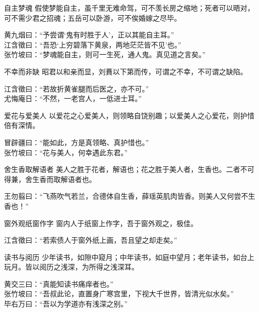 \begin{yulu}{自主梦魂}
假使梦能自主，虽千里无难命驾，可不羡长房之缩地；死者可以晤对，可不需少君之招魂；五岳可以卧游，可不俟婚嫁之尽毕。
\begin{comments}
黄九烟曰：“予尝谓‘鬼有时胜于人’，正以其能自主耳。” \\
江含徵曰：“吾恐‘上穷碧落下黄泉，两地茫茫皆不见’也。” \\
张竹坡曰：“梦魂能自主，则可一生死，通人鬼。真见道之言矣。”
\end{comments}
\end{yulu}

\begin{yulu}{不幸而非缺}
昭君以和亲而显，刘蕡以下第而传，可谓之不幸，不可谓之缺陷。
\begin{comments}
江含徵曰：“若故折黄雀腿而后医之，亦不可。” \\
尤悔庵日：“不然，一老宫人，一低进士耳。”
\end{comments}
\end{yulu}

\begin{yulu}{爱花与爱美人}
以爱花之心爱美人，则领略自饶别趣；以爱美人之心爱花，则护惜倍有深情。
\begin{comments}
冒辟疆曰：“能如此，方是真领略、真护惜也。” \\
张竹坡曰：“花与美人，何幸遇此东君。”
\end{comments}
\end{yulu}

\begin{yulu}{舍生香取解语者}
美人之胜于花者，解语也；花之胜于美人者，生香也。二者不可得兼，舍生香而取解语者也。
\begin{comments}
王勿翦曰：“飞燕吹气若兰，合德体自生香，薛瑶英肌肉皆香。则美人又何尝不生香也！”
\end{comments}
\end{yulu}

\begin{yulu}{窗外观纸窗作字}
窗内人于纸窗上作字，吾于窗外观之，极佳。
\begin{comments}
江含徵曰：“若索债人于窗外纸上画，吾且望之却走矣。”
\end{comments}
\end{yulu}

\begin{yulu}{读书与阅历}
少年读书，如隙中窥月；中年读书，如庭中望月；老年读书，如台上玩月。皆以阅历之浅深，为所得之浅深耳。
\begin{comments}
黄交三曰：“真能知读书痛痒者也。” \\
张竹坡曰：“吾叔此论，直置身广寒宫里，下视大千世界，皆清光似水矣。” \\
毕右万曰：“吾以为学道亦有浅深之别。”
\end{comments}
\end{yulu}

